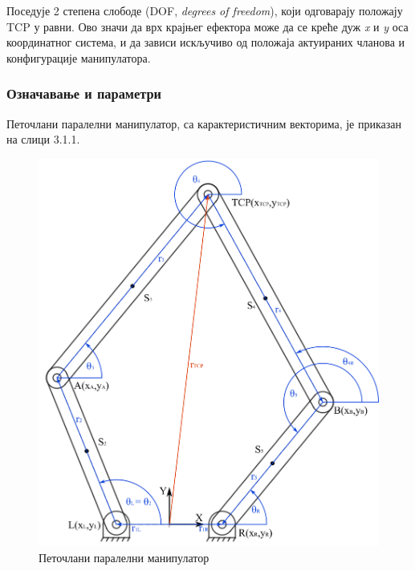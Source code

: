 \documentclass[12pt]{article}
\begin{document}
 Поседује 2 степена слободе (DOF, \textit{degrees of freedom}), који одговарају положају TCP у равни. Ово значи да врх крајњег ефектора може да се креће дуж \textit{x} и \textit{y} оса координатног система, и да зависи искључиво од положаја актуираних чланова и конфигурације манипулатора.

\subsubsection{Означавање и параметри}
Петочлани паралелни манипулатор, са карактеристичним векторима, је приказан на слици 3.1.1.
\begin{figure}[H]
    \centering
    \includegraphics[width=12cm]{figures/5bar.jpg}
    \caption{Петочлани паралелни манипулатор}
    \label{fig:5bar_manipulator}
\end{figure}
\end{document}
